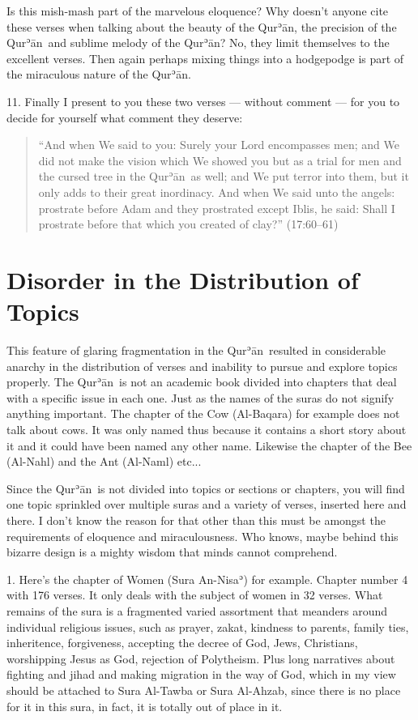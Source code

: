 \documentclass[12pt]{memoir}
\def\´{ʾ} %
\newcommand{\ar}[1]{\RL{\arabicfont#1}}
\def \Quran{Qur\-\´ān} %
\def\–{-\hskip0pt}
\def\pardivider{\centerline{\ar{۞۞۞}}} %
\newcommand{\QRef}[1]{{\color{darkblue}#1}}
\begin{document}
Is this mish-mash part of the marvelous eloquence?
Why doesn’t anyone cite these verses when talking
about the beauty of the \Quran,
the precision of the \Quran\ and sublime melody of the \Quran?
No, they limit themselves to the excellent verses.
Then again perhaps mixing things into a hodgepodge
is part of the miraculous nature of the \Quran.

11. Finally I present to you these two verses — without comment —
for you to decide for yourself what comment they deserve:

\begin{quote}
“And when We said to you: Surely your Lord encompasses men;
and We did not make the vision which We showed you
but as a trial for men and the cursed tree in the \Quran\ as well;
and We put terror into them, but it only adds to their great inordinacy.
And when We said unto the angels:
prostrate before Adam and they prostrated except Iblis, he said:
Shall I prostrate before that which you created of clay?”
(\QRef{17:60–61})
\end{quote}

\pardivider


\section{Disorder in the Distribution of Topics}

This feature of glaring fragmentation in the \Quran\
resulted in considerable anarchy in the distribution of verses
and inability to pursue and explore topics properly.
The \Quran\ is not an academic book divided into chapters
that deal with a specific issue in each one.
Just as the names of the suras do not signify anything important.
The chapter of the Cow (Al\–Baqara) for example does not talk about cows.
It was only named thus because it contains a short story about it
and it could have been named any other name.
Likewise the chapter of the Bee (Al-Nahl) and the Ant (Al-Naml) etc...

Since the \Quran\ is not divided into topics or sections or chapters,
you will find one topic sprinkled over multiple suras
and a variety of verses, inserted here and there.
I don’t know the reason for that other than this must be
amongst the requirements of eloquence and miraculousness.
Who knows, maybe behind this bizarre design
is a mighty wisdom that minds cannot comprehend.

1. Here’s the chapter of Women (Sura An\–Nisa\´) for example.
Chapter number 4 with 176 verses.
It only deals with the subject of women in 32 verses.
What remains of the sura is a fragmented varied assortment
that meanders around individual religious issues,
such as prayer, zakat, kindness to parents, family ties, inheritence,
forgiveness, accepting the decree of God, Jews, Christians,
worshipping Jesus as God, rejection of Polytheism.
Plus long narratives about fighting and jihad and making migration
in the way of God, which in my view should be attached to Sura Al\–Tawba
or Sura Al\–Ahzab, since there is no place for it in this sura,
in fact, it is totally out of place in it.
\end{document}
